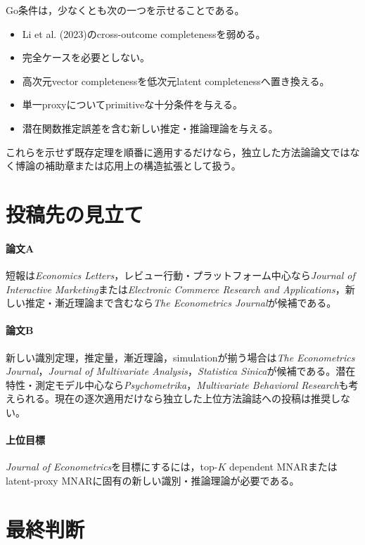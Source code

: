 \documentclass[a4paper,11pt,xelatex,ja=standard]{bxjsarticle}
\begin{document}
Go条件は，少なくとも次の一つを示せることである。
\begin{itemize}
  \item Li et al. (2023)のcross-outcome completenessを弱める。
  \item 完全ケースを必要としない。
  \item 高次元vector completenessを低次元latent completenessへ置き換える。
  \item 単一proxyについてprimitiveな十分条件を与える。
  \item 潜在関数推定誤差を含む新しい推定・推論理論を与える。
\end{itemize}

これらを示せず既存定理を順番に適用するだけなら，独立した方法論論文ではなく博論の補助章または応用上の構造拡張として扱う。

\section{投稿先の見立て}

\paragraph{論文A}
短報は\textit{Economics Letters}，レビュー行動・プラットフォーム中心なら\textit{Journal of Interactive Marketing}または\textit{Electronic Commerce Research and Applications}，新しい推定・漸近理論まで含むなら\textit{The Econometrics Journal}が候補である。

\paragraph{論文B}
新しい識別定理，推定量，漸近理論，simulationが揃う場合は\textit{The Econometrics Journal}，\textit{Journal of Multivariate Analysis}，\textit{Statistica Sinica}が候補である。潜在特性・測定モデル中心なら\textit{Psychometrika}，\textit{Multivariate Behavioral Research}も考えられる。現在の逐次適用だけなら独立した上位方法論誌への投稿は推奨しない。

\paragraph{上位目標}
\textit{Journal of Econometrics}を目標にするには，top-$K$ dependent MNARまたはlatent-proxy MNARに固有の新しい識別・推論理論が必要である。

\section{最終判断}
\end{document}
